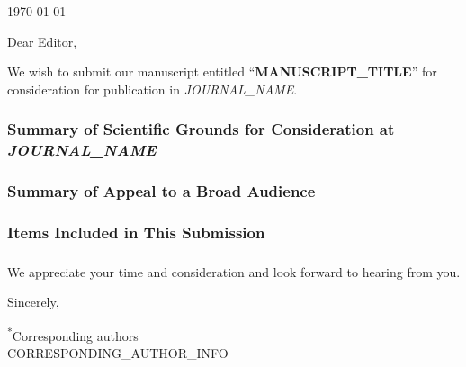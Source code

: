 \documentclass[11pt]{article}
\newcommand{\journalname}{{{JOURNAL_NAME}}}
\newcommand{\manuscripttitle}{{{MANUSCRIPT_TITLE}}}
\begin{document}
\noindent \today

\bigskip
\noindent Dear Editor,

\noindent We wish to submit our manuscript entitled ``\textbf{\manuscripttitle}'' for consideration for publication in \textit{\journalname}.

\subsubsection{}

\subsubsection{}

\subsubsection*{Summary of Scientific Grounds for Consideration at \textit{\journalname}}

\subsubsection*{Summary of Appeal to a Broad Audience}

\subsubsection{Items Included in This Submission}

\subsubsection{}

\subsubsection{}
\noindent We appreciate your time and consideration and look forward to hearing from you.

\bigskip
\noindent Sincerely,

\bigskip
{}

\medskip
\noindent\textsuperscript{*}Corresponding authors\\
{{CORRESPONDING_AUTHOR_INFO}}


\end{document}
